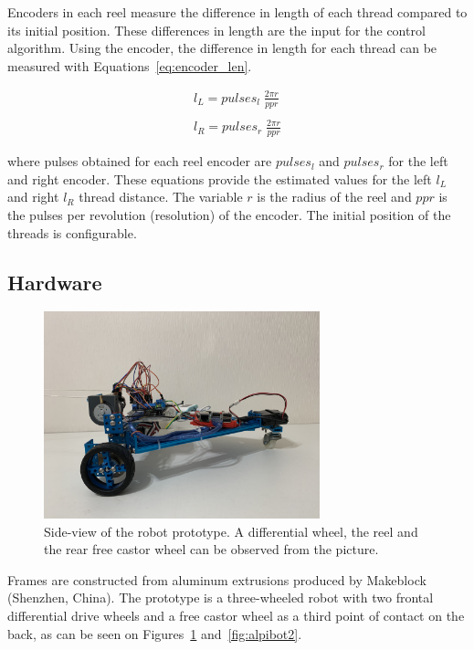 \documentclass[journal]{IEEEtran}
\begin{document}
Encoders in each reel measure the difference in length of each thread compared to its initial position. These differences in length are the input for the control algorithm.  Using the encoder, the difference in length for each thread can be measured with Equations~\ref{eq:encoder_len}.

\begin{equation}
\label{eq:encoder_len}
\begin{array}{ll}  
l_L = pulses_{l} \; \frac{2\pi r}{ppr}  \\
\\
l_R = pulses_{r} \; \frac{2\pi r}{ppr}
\end{array}
\end{equation}{}

\noindent where pulses obtained for each reel encoder are $pulses_{l}$ and $pulses_{r}$ for the left and right encoder. These equations provide the estimated values for the left $l_L$ and right $l_R$  thread distance. The variable $r$ is the radius of the reel and $ppr$ is the pulses per revolution (resolution) of the encoder.  The initial position of the threads is configurable.

\subsection{Hardware}

\begin{figure}[h!]
\centering
\includegraphics[width=8cm]{images/alpibot1.jpg}
\caption{Side-view of the robot prototype.  A differential wheel, the reel and the rear free castor wheel can be observed from the picture.}
\label{fig:alpibot1}
\end{figure}


Frames are constructed from aluminum extrusions produced by Makeblock (Shenzhen, China).   The prototype is a three-wheeled robot with two frontal differential drive wheels and a free castor wheel as a third point of contact on the back, as can be seen on Figures~\ref{fig:alpibot1} and~\ref{fig:alpibot2}.  
\end{document}
